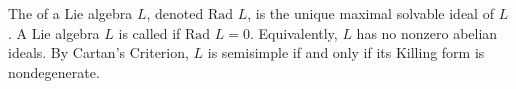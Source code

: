 The  of a Lie algebra $L$, denoted $\text{Rad } L$, is the unique maximal solvable ideal of $L$. A Lie algebra $L$ is called  if $\text{Rad } L = 0$. Equivalently, $L$ has no nonzero abelian ideals. By Cartan's Criterion, $L$ is semisimple if and only if its Killing form is nondegenerate.
